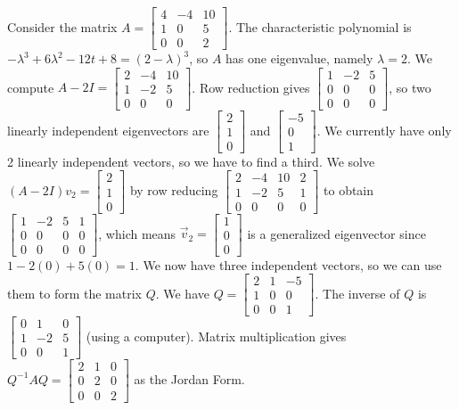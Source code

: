 \begin{example}
Consider the matrix 
$A=
\begin{bmatrix}
4&-4&10\\
1&0&5\\
0&0&2
\end{bmatrix}
$. The characteristic polynomial is $-\lambda^3+6\lambda^2-12 t+8 = (2-\lambda)^3$, so $A$ has one eigenvalue, namely $\lambda=2$.  We compute $A-2I = \begin{bmatrix} 2&-4&10\\1&-2&5
\\0&0&0\end{bmatrix} 
$.  Row reduction gives $\begin{bmatrix} 1&-2&5\\0&0&0
\\0&0&0\end{bmatrix} 
$, so two linearly independent eigenvectors are $\begin{bmatrix}2\\1\\0\end{bmatrix}$   and $\begin{bmatrix}-5\\0\\1\end{bmatrix}$.  We currently have only 2 linearly independent vectors, so we have to find a third.  We solve $(A-2I)v_2= \begin{bmatrix}2\\1\\0\end{bmatrix}$ by row reducing $ \begin{bmatrix} 2&-4&10&2\\1&-2&5&1
\\0&0&0&0\end{bmatrix} 
$ to obtain $\begin{bmatrix} 1&-2&5&1\\0&0&0&0
\\0&0&0&0\end{bmatrix}$, which means $\vec v_2=\begin{bmatrix}1\\0\\0\end{bmatrix}$ is a generalized eigenvector since $1-2(0)+5(0)=1$. We now have three independent vectors, so we can use them to form the matrix $Q$.
We have $Q= \begin{bmatrix} 2&1&-5\\1&0&0
\\0&0&1\end{bmatrix}$.  The inverse of $Q$ is 
$\begin{bmatrix} 0&1&0\\1&-2&5
\\0&0&1\end{bmatrix}
$ (using a computer). Matrix multiplication gives $Q^{-1}AQ = \begin{bmatrix} 2&1&0\\0&2&0
\\0&0&2\end{bmatrix}
$ as the Jordan Form.


\end{example}

